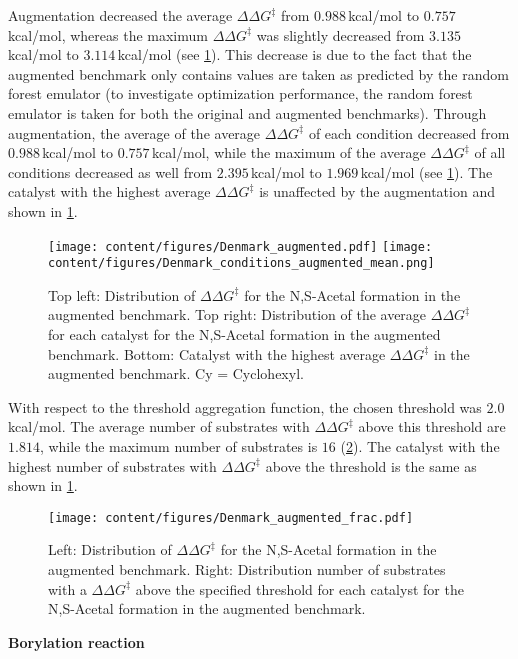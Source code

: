 Augmentation decreased the average $\Delta\Delta G^{\ddagger}$ from $0.988$\,kcal/mol to $0.757$\,kcal/mol, whereas the maximum $\Delta\Delta G^{\ddagger}$ was slightly decreased from $3.135$\,kcal/mol to $3.114$\,kcal/mol (see \cref{fig:Denmark_EDA_augmented}). 
This decrease is due to the fact that the augmented benchmark only contains values are taken as predicted by the random forest emulator (to investigate optimization performance, the random forest emulator is taken for both the original and augmented benchmarks).
Through augmentation, the average of the average $\Delta\Delta G^{\ddagger}$ of each condition decreased from $0.988$\,kcal/mol to $0.757$\,kcal/mol, while the maximum of the average $\Delta\Delta G^{\ddagger}$ of all conditions decreased as well from $2.395$\,kcal/mol to $1.969$\,kcal/mol (see \cref{fig:Denmark_EDA_augmented}).
The catalyst with the highest average $\Delta\Delta G^{\ddagger}$ is unaffected by the augmentation and shown in \cref{fig:Denmark_EDA_augmented}.

\begin{figure}[h]
    \centering
    \texttt{[image: content/figures/Denmark\_augmented.pdf]}
    \texttt{[image: content/figures/Denmark\_conditions\_augmented\_mean.png]}
    \caption{Top left: Distribution of $\Delta\Delta G^{\ddagger}$ for the N,S-Acetal formation in the augmented benchmark. Top right: Distribution of the average $\Delta\Delta G^{\ddagger}$ for each catalyst for the N,S-Acetal formation in the augmented benchmark. Bottom: Catalyst with the highest average $\Delta\Delta G^{\ddagger}$ in the augmented benchmark. Cy = Cyclohexyl.}
    \label{fig:Denmark_EDA_augmented}
\end{figure}

With respect to the threshold aggregation function, the chosen threshold was $2.0$\,kcal/mol.
The average number of substrates with $\Delta\Delta G^{\ddagger}$ above this threshold are $1.814$, while the maximum number of substrates is $16$ (\cref{fig:Denmark_EDA_frac_augmented}).
The catalyst with the highest number of substrates with $\Delta\Delta G^{\ddagger}$ above the threshold is the same as shown in \cref{fig:Denmark_EDA_augmented}.

\begin{figure}[h]
    \centering
    \texttt{[image: content/figures/Denmark\_augmented\_frac.pdf]}
    \caption{Left: Distribution of $\Delta\Delta G^{\ddagger}$ for the N,S-Acetal formation in the augmented benchmark. Right: Distribution number of substrates with a  $\Delta\Delta G^{\ddagger}$ above the specified threshold for each catalyst for the N,S-Acetal formation in the augmented benchmark.}
    \label{fig:Denmark_EDA_frac_augmented}
\end{figure}
\newpage
\textbf{Borylation reaction}

